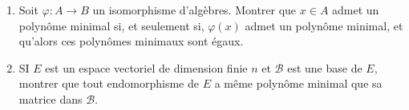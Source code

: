 \documentclass[french]{article}
\theoremstyle{plain}
\theoremstyle{definition}
\theoremstyle{remark}
\begin{document}
\begin{exo}
	\begin{enumerate}
		\item Soit $\varphi:A\to B$ un isomorphisme d'algèbres. Montrer que $x\in A$ admet un polynôme minimal si, et seulement si, $\varphi(x)$ admet un polynôme minimal, et qu'alors ces polynômes minimaux sont égaux.
		\item SI $E$ est un espace vectoriel de dimension finie $n$ et $\mathcal{B}$ est une base de $E$, montrer que tout endomorphisme de $E$ a même polynôme minimal que sa matrice dans $\mathcal{B}$.
	\end{enumerate}
\end{exo}
\end{document}
